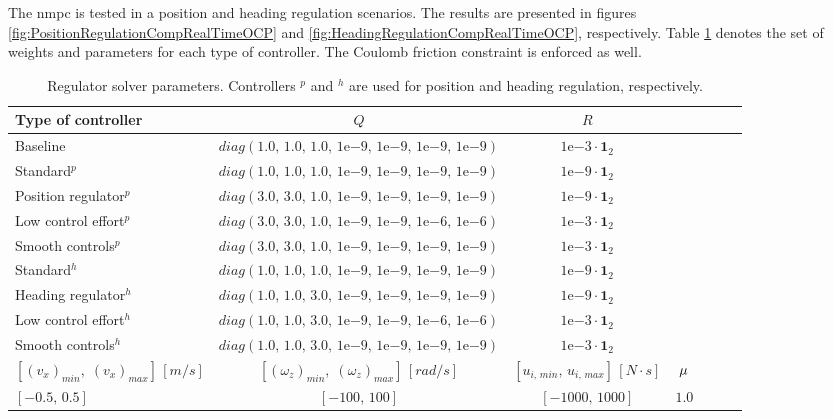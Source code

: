 The \acrshort{nmpc} is tested in a position and heading regulation scenarios. The results are presented in figures \ref{fig:PositionRegulationCompRealTimeOCP} and \ref{fig:HeadingRegulationCompRealTimeOCP}, respectively. Table \ref{tab:regulatorWeights} denotes the set of weights and parameters for each type of controller. The Coulomb friction constraint is enforced as well.

\begin{table}[!htb]
  \caption{Regulator solver parameters. Controllers $^p$ and $^h$ are used for position and heading regulation, respectively.}
  \label{tab:regulatorWeights}
  \renewcommand{\arraystretch}{1.1}
  \centering
  \begin{tabular}[]{lcccccc}
	\toprule
    Type of controller & $Q$ & $R$\\
	\midrule
    Baseline & $diag\left(1.0,\,1.0,\,1.0,\,1\mathrm{e}{-9},\,1\mathrm{e}{-9},\,1\mathrm{e}{-9},\,1\mathrm{e}{-9}\right)$ & $1\mathrm{e}{-3}\cdot \mathbf{1}_2$\\
	Standard$^p$ & $diag\left(1.0,\,1.0,\,1.0,\,1\mathrm{e}{-9},\,1\mathrm{e}{-9},\,1\mathrm{e}{-9},\,1\mathrm{e}{-9}\right)$ & $1\mathrm{e}{-9}\cdot \mathbf{1}_2$\\
	Position regulator$^p$ & $diag\left(3.0,\,3.0,\,1.0,\,1\mathrm{e}{-9},\,1\mathrm{e}{-9},\,1\mathrm{e}{-9},\,1\mathrm{e}{-9}\right)$ & $1\mathrm{e}{-9}\cdot \mathbf{1}_2$\\
	Low control effort$^p$ & $diag\left(3.0,\,3.0,\,1.0,\,1\mathrm{e}{-9},\,1\mathrm{e}{-9},\,1\mathrm{e}{-6},\,1\mathrm{e}{-6}\right)$ & $1\mathrm{e}{-3}\cdot \mathbf{1}_2$\\
	Smooth controls$^p$ & $diag\left(3.0,\,3.0,\,1.0,\,1\mathrm{e}{-9},\,1\mathrm{e}{-9},\,1\mathrm{e}{-9},\,1\mathrm{e}{-9}\right)$ & $1\mathrm{e}{-3}\cdot \mathbf{1}_2$\\
	Standard$^h$ & $diag\left(1.0,\,1.0,\,1.0,\,1\mathrm{e}{-9},\,1\mathrm{e}{-9},\,1\mathrm{e}{-9},\,1\mathrm{e}{-9}\right)$ & $1\mathrm{e}{-9}\cdot \mathbf{1}_2$\\
	Heading regulator$^h$ & $diag\left(1.0,\,1.0,\,3.0,\,1\mathrm{e}{-9},\,1\mathrm{e}{-9},\,1\mathrm{e}{-9},\,1\mathrm{e}{-9}\right)$ & $1\mathrm{e}{-9}\cdot \mathbf{1}_2$\\
	Low control effort$^h$ & $diag\left(1.0,\,1.0,\,3.0,\,1\mathrm{e}{-9},\,1\mathrm{e}{-9},\,1\mathrm{e}{-6},\,1\mathrm{e}{-6}\right)$ & $1\mathrm{e}{-3}\cdot \mathbf{1}_2$\\
	Smooth controls$^h$ & $diag\left(1.0,\,1.0,\,3.0,\,1\mathrm{e}{-9},\,1\mathrm{e}{-9},\,1\mathrm{e}{-9},\,1\mathrm{e}{-9}\right)$ & $1\mathrm{e}{-3}\cdot \mathbf{1}_2$\\
  	\toprule
  	$\left[(v_x)_{min},\; (v_x)_{max}\right]\,[m/s]$ & $\left[(\omega_z)_{min},\; (\omega_z)_{max}\right]\,[rad/s]$ & $\left[u_{i,\,min},\,u_{i,\,max}\right]\,[N \cdot s]$ & $\mu$\\
  	\midrule
  	$\left[-0.5,\,0.5\right]$ & $\left[-100,\,100\right]$ & $\left[-1000,\,1000\right]$ & $1.0$\\
  	\bottomrule
  \end{tabular}
\end{table}


